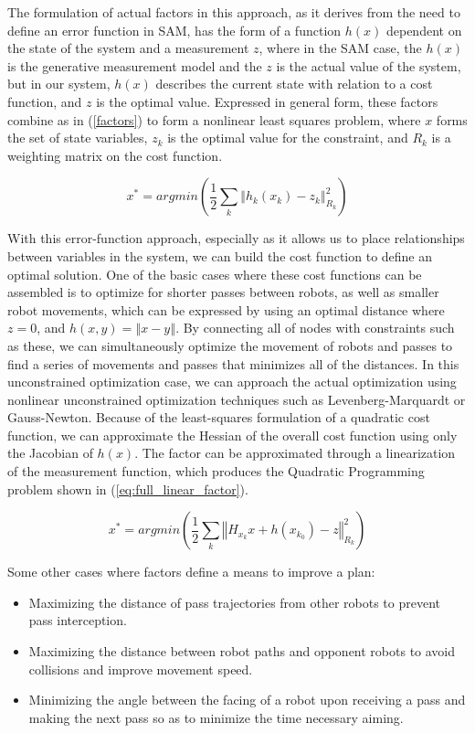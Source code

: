 \documentclass[a4paper, 10pt, conference]{ieeeconf}      %
\begin{document}
The formulation of actual factors in this approach, as it derives from the need to define an error function in SAM, has the form of a function $h(x)$ dependent on the state of the system and a measurement $z$, where in the SAM case, the $h(x)$ is the generative measurement model and the $z$ is the actual value of the system, but in our system, $h(x)$ describes the current state with relation to a cost function, and $z$ is the optimal value.  Expressed in general form, these factors combine as in (\ref{factors}) to form a nonlinear least squares problem, where $x$ forms the set of state variables, $z_{k}$ is the optimal value for the constraint, and $R_{k}$ is a weighting matrix on the cost function.

\begin{equation} \label{factors}
 x^{*} = argmin(\frac{1}{2}\sum_{k}\left\Vert h_{k}(x_{k})-z_{k}\right\Vert _{R_{k}}^{2})
\end{equation} 

With this error-function approach, especially as it allows us to place relationships between variables in the system, we can build the cost function to define an optimal solution.  One of the basic cases where these cost functions can be assembled is to optimize for shorter passes between robots, as well as smaller robot movements, which can be expressed by using an optimal distance where $z=0$, and $h(x,y)=\left\Vert x-y \right\Vert$.  By connecting all of nodes with constraints such as these, we can simultaneously optimize the movement of robots and passes to find a series of movements and passes that minimizes all of the distances.  In this unconstrained optimization case, we can approach the actual optimization using nonlinear unconstrained optimization techniques such as Levenberg-Marquardt or Gauss-Newton. Because of the least-squares formulation of a quadratic cost function, we can approximate the Hessian of the overall cost function using only the Jacobian of $h(x)$.  The factor can be approximated through a linearization of the measurement function, which produces the Quadratic Programming problem shown in (\ref{eq:full_linear_factor}).  

\begin{equation} \label{eq:full_linear_factor}
x^{*} = argmin(\frac{1}{2}\sum_{k}\left\Vert H_{x_{k}}x+h(x_{k_{0}})-z\right\Vert _{R_{k}}^{2})
\end{equation}

Some other cases where factors define a means to improve a plan:
\begin{itemize}
 \item Maximizing the distance of pass trajectories from other robots to prevent pass interception.
 \item Maximizing the distance between robot paths and opponent robots to avoid collisions and improve movement speed.
 \item Minimizing the angle between the facing of a robot upon receiving a pass and making the next pass so as to minimize the time necessary aiming.  
\end{itemize}
\end{document}
